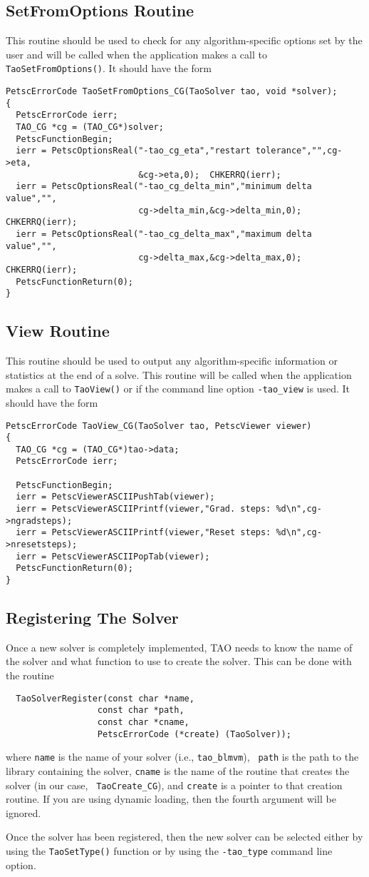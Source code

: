 \subsection{SetFromOptions Routine}
This routine should be used to check for any algorithm-specific options set 
by the user and will be called when the application makes a call
to {\tt TaoSetFromOptions()}.  It should have the form
\begin{verbatim}
PetscErrorCode TaoSetFromOptions_CG(TaoSolver tao, void *solver);
{
  PetscErrorCode ierr;
  TAO_CG *cg = (TAO_CG*)solver;
  PetscFunctionBegin;
  ierr = PetscOptionsReal("-tao_cg_eta","restart tolerance","",cg->eta,
                          &cg->eta,0);  CHKERRQ(ierr);
  ierr = PetscOptionsReal("-tao_cg_delta_min","minimum delta value","",
                          cg->delta_min,&cg->delta_min,0); CHKERRQ(ierr);
  ierr = PetscOptionsReal("-tao_cg_delta_max","maximum delta value","",
                          cg->delta_max,&cg->delta_max,0); CHKERRQ(ierr);
  PetscFunctionReturn(0);
}
\end{verbatim}

\subsection{View Routine}
This routine should be used to output any algorithm-specific information
or statistics at the end of a solve.
This routine will be called when the application makes a call to 
{\tt TaoView()} or if the command line option {\tt -tao\_view} is used.
It should have the form
\begin{verbatim}
PetscErrorCode TaoView_CG(TaoSolver tao, PetscViewer viewer)
{ 
  TAO_CG *cg = (TAO_CG*)tao->data;
  PetscErrorCode ierr;

  PetscFunctionBegin;
  ierr = PetscViewerASCIIPushTab(viewer);
  ierr = PetscViewerASCIIPrintf(viewer,"Grad. steps: %d\n",cg->ngradsteps);
  ierr = PetscViewerASCIIPrintf(viewer,"Reset steps: %d\n",cg->nresetsteps);
  ierr = PetscViewerASCIIPopTab(viewer);
  PetscFunctionReturn(0);
}
\end{verbatim}


\subsection{Registering The Solver}
Once a new solver is completely implemented, TAO needs to know the name of
the solver and what function to use to create the solver.  This can be done
with the routine
\begin{verbatim}
  TaoSolverRegister(const char *name, 
                  const char *path,
                  const char *cname, 
                  PetscErrorCode (*create) (TaoSolver));
\end{verbatim}
\noindent
where {\tt name} is the name of your solver (i.e., {\tt tao\_blmvm}), {\tt
path} is the path to the library containing the solver, {\tt cname} is the
name of the routine that creates the solver (in our case, {\tt
  TaoCreate\_CG}), and {\tt create} is a pointer to that creation
routine.  If you are using dynamic loading, then the fourth argument will be
ignored. 

Once the solver has been registered, then the new solver can be selected 
either by using the \texttt{TaoSetType()} function or by using the \texttt{-tao\_type} command line option.



